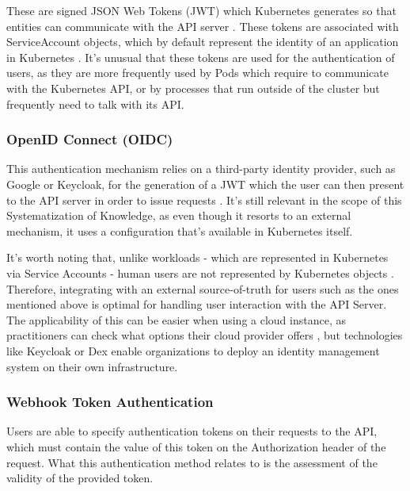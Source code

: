 \documentclass[a4paper,11pt,openright,BCOR=15mm]{scrbook}
\begin{document}
These are signed JSON Web Tokens (JWT) which Kubernetes generates so that entities can communicate with the API server \cite{the_linux_foundation_authenticating_2024}. These tokens are associated with ServiceAccount objects, which by default represent the identity of an application in Kubernetes \cite{martin_hacking_2021}. It's unusual that these tokens are used for the authentication of users, as they are more frequently used by Pods which require to communicate with the Kubernetes API, or by processes that run outside of the cluster but frequently need to talk with its API.

\subsubsection{OpenID Connect (OIDC)}

This authentication mechanism relies on a third-party identity provider, such as Google or Keycloak, for the generation of a JWT which the user can then present to the API server in order to issue requests \cite{the_linux_foundation_authenticating_2024}. It's still relevant in the scope of this Systematization of Knowledge, as even though it resorts to an external mechanism, it uses a configuration that's available in Kubernetes itself.

It's worth noting that, unlike workloads - which are represented in Kubernetes via Service Accounts - human users are not represented by Kubernetes objects \cite{the_linux_foundation_authenticating_2024,martin_hacking_2021}. Therefore, integrating with an external source-of-truth for users such as the ones mentioned above is optimal for handling user interaction with the API Server. The applicability of this can be easier when using a cloud instance, as practitioners can check what options their cloud provider offers \cite{martin_hacking_2021}, but technologies like Keycloak or Dex enable organizations to deploy an identity management system on their own infrastructure.

\subsubsection{Webhook Token Authentication}

Users are able to specify authentication tokens on their requests to the API, which must contain the value of this token on the Authorization header of the request. What this authentication method relates to is the assessment of the validity of the provided token.
\end{document}
